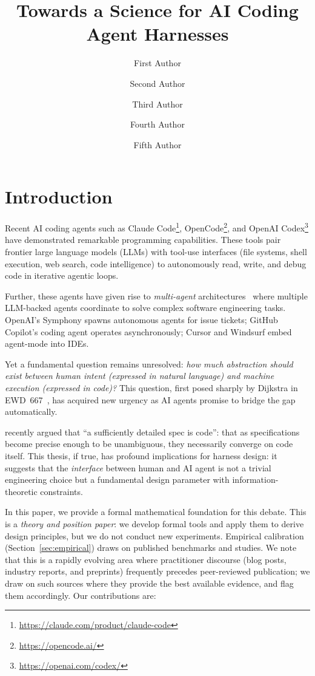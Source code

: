 \documentclass[11pt, a4paper, logo, copyright]{googledeepmind}
\title{Towards a Science for AI Coding Agent Harnesses}
\author[1]{First Author}
\author[2]{Second Author}
\author[2]{Third Author}
\author[1]{Fourth Author}
\author[1]{Fifth Author}
\affil[]{Pragnition Labs}
\affil[*]{Equal Contribution}
\affil[1]{Affiliation 1}
\affil[2]{Affiliation 2}
\begin{document}
\maketitle


\section{Introduction}

Recent AI coding agents such as Claude Code\footnote{\url{https://claude.com/product/claude-code}}, OpenCode\footnote{\url{https://opencode.ai/}}, and OpenAI Codex\footnote{\url{https://openai.com/codex/}} have demonstrated remarkable programming capabilities. These tools pair frontier large language models (LLMs) with tool-use interfaces (file systems, shell execution, web search, code intelligence) to autonomously read, write, and debug code in iterative agentic loops.

Further, these agents have given rise to \emph{multi-agent} architectures~\citep{kim2025scaling} where multiple LLM-backed agents coordinate to solve complex software engineering tasks. OpenAI's Symphony spawns autonomous agents for issue tickets; GitHub Copilot's coding agent operates asynchronously; Cursor and Windsurf embed agent-mode into IDEs.

Yet a fundamental question remains unresolved: \emph{how much abstraction should exist between human intent (expressed in natural language) and machine execution (expressed in code)?} This question, first posed sharply by Dijkstra in EWD~667~\citep{dijkstra1978foolishness}, has acquired new urgency as AI agents promise to bridge the gap automatically.

\citet{gonzalez2026spec} recently argued that ``a sufficiently detailed spec is code'': that as specifications become precise enough to be unambiguous, they necessarily converge on code itself. This thesis, if true, has profound implications for harness design: it suggests that the \emph{interface} between human and AI agent is not a trivial engineering choice but a fundamental design parameter with information-theoretic constraints.

In this paper, we provide a formal mathematical foundation for this debate. This is a \emph{theory and position paper}: we develop formal tools and apply them to derive design principles, but we do not conduct new experiments. Empirical calibration (Section~\ref{sec:empirical}) draws on published benchmarks and studies. We note that this is a rapidly evolving area where practitioner discourse (blog posts, industry reports, and preprints) frequently precedes peer-reviewed publication; we draw on such sources where they provide the best available evidence, and flag them accordingly. Our contributions are:
\end{document}
